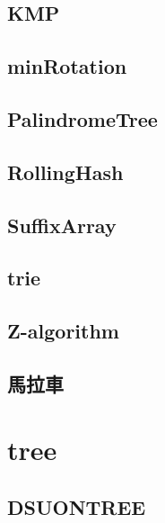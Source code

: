 \documentclass[a4paper,10pt,twocolumn,oneside]{article}
\begin{document}
    \subsection{KMP}
    

    \subsection{minRotation}
    

    \subsection{PalindromeTree}
    

    \subsection{RollingHash}
    

    \subsection{SuffixArray}
    

    \subsection{trie}
    

    \subsection{Z-algorithm}
    

    \subsection{馬拉車}
    

\section{tree}
    \subsection{DSUONTREE}
    
\end{document}
